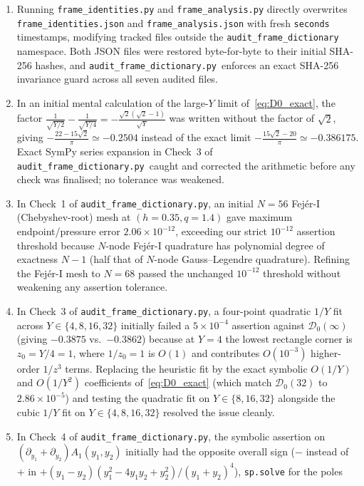 \documentclass[11pt,a4paper]{article}
\newcommand{\scr}{\texttt{audit\_\allowbreak frame\_\allowbreak dictionary.py}}
\begin{document}
\begin{enumerate}
\item Running \texttt{frame\_\allowbreak identities.py} and
\texttt{frame\_\allowbreak analysis.py} directly overwrites
\texttt{frame\_\allowbreak identities.json} and
\texttt{frame\_\allowbreak analysis.json} with fresh \texttt{seconds} timestamps,
modifying tracked files outside the \texttt{audit\_\allowbreak frame\_\allowbreak dictionary}
namespace. Both JSON files were restored byte-for-byte to their initial SHA-256
hashes, and \scr\ enforces an exact SHA-256 invariance guard across all seven
audited files.
\item In an initial mental calculation of the large-$Y$ limit of~\eqref{eq:D0_exact},
the factor $\frac{1}{\sqrt{Y/2}}-\frac{1}{\sqrt{Y/4}}=-\frac{\sqrt2(\sqrt2-1)}{\sqrt Y}$
was written without the factor of $\sqrt2$, giving $-\frac{22-15\sqrt2}{\pi}\simeq -0.2504$
instead of the exact limit $-\frac{15\sqrt2-20}{\pi}\simeq -0.386175$. Exact SymPy
series expansion in Check~3 of \scr\ caught and corrected the arithmetic before
any check was finalised; no tolerance was weakened.
\item In Check~1 of \scr, an initial $N=56$ Fej\'er-I (Chebyshev-root) mesh at
$(h=0.35,q=1.4)$ gave maximum endpoint/pressure error $2.06\times 10^{-12}$,
exceeding our strict $10^{-12}$ assertion threshold because $N$-node Fej\'er-I
quadrature has polynomial degree of exactness $N-1$ (half that of $N$-node
Gauss--Legendre quadrature). Refining the Fej\'er-I mesh to $N=68$ passed the
unchanged $10^{-12}$ threshold without weakening any assertion tolerance.
\item In Check~3 of \scr, a four-point quadratic $1/Y$ fit across $Y\in\{4,8,16,32\}$
initially failed a $5\times 10^{-4}$ assertion against $\mathcal D_0(\infty)$ (giving
$-0.3875$ vs.\ $-0.3862$) because at $Y=4$ the lowest rectangle corner is $z_0=Y/4=1$,
where $1/z_0=1$ is $O(1)$ and contributes $O(10^{-3})$ higher-order $1/z^3$ terms.
Replacing the heuristic fit by the exact symbolic $O(1/Y)$ and $O(1/Y^2)$ coefficients
of~\eqref{eq:D0_exact} (which match $\mathcal D_0(32)$ to $2.86\times 10^{-5}$) and
testing the quadratic fit on $Y\in\{8,16,32\}$ alongside the cubic $1/Y$ fit on
$Y\in\{4,8,16,32\}$ resolved the issue cleanly.
\item In Check~4 of \scr, the symbolic assertion on $(\partial_{y_1}+\partial_{y_2})A_1(y_1,y_2)$
initially had the opposite overall sign ($-$ instead of $+$ in
$+(y_1-y_2)(y_1^2-4y_1y_2+y_2^2)/(y_1+y_2)^4$), \texttt{sp.solve} for the poles

\end{enumerate}
\end{document}

